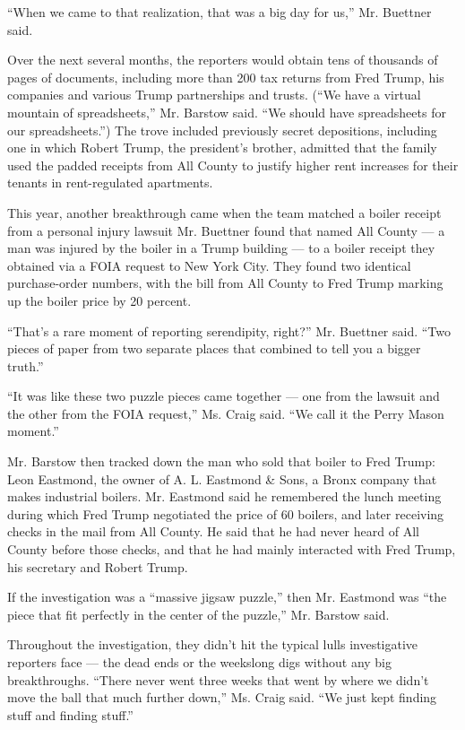 ``When we came to that realization, that was a big day for us,'' Mr.
Buettner said.

Over the next several months, the reporters would obtain tens of
thousands of pages of documents, including more than 200 tax returns
from Fred Trump, his companies and various Trump partnerships and
trusts. (``We have a virtual mountain of spreadsheets,'' Mr. Barstow
said. ``We should have spreadsheets for our spreadsheets.'') The trove
included previously secret depositions, including one in which Robert
Trump, the president's brother, admitted that the family used the padded
receipts from All County to justify higher rent increases for their
tenants in rent-regulated apartments.

This year, another breakthrough came when the team matched a boiler
receipt from a personal injury lawsuit Mr. Buettner found that named All
County --- a man was injured by the boiler in a Trump building --- to a
boiler receipt they obtained via a FOIA request to New York City. They
found two identical purchase-order numbers, with the bill from All
County to Fred Trump marking up the boiler price by 20 percent.

``That's a rare moment of reporting serendipity, right?'' Mr. Buettner
said. ``Two pieces of paper from two separate places that combined to
tell you a bigger truth.''

``It was like these two puzzle pieces came together --- one from the
lawsuit and the other from the FOIA request,'' Ms. Craig said. ``We call
it the Perry Mason moment.''

Mr. Barstow then tracked down the man who sold that boiler to Fred
Trump: Leon Eastmond, the owner of A. L. Eastmond \& Sons, a Bronx
company that makes industrial boilers. Mr. Eastmond said he remembered
the lunch meeting during which Fred Trump negotiated the price of 60
boilers, and later receiving checks in the mail from All County. He said
that he had never heard of All County before those checks, and that he
had mainly interacted with Fred Trump, his secretary and Robert Trump.

If the investigation was a ``massive jigsaw puzzle,'' then Mr. Eastmond
was ``the piece that fit perfectly in the center of the puzzle,'' Mr.
Barstow said.

Throughout the investigation, they didn't hit the typical lulls
investigative reporters face --- the dead ends or the weekslong digs
without any big breakthroughs. ``There never went three weeks that went
by where we didn't move the ball that much further down,'' Ms. Craig
said. ``We just kept finding stuff and finding stuff.''

